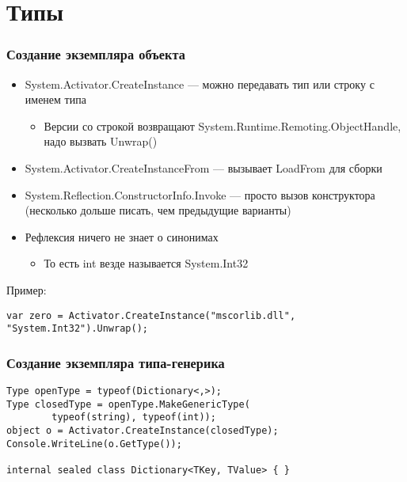 \documentclass{../../slides-style}
\begin{document}
    \section{Типы}

    \begin{frame}[fragile]
        \frametitle{Создание экземпляра объекта}
        \begin{itemize}
            \item System.Activator.CreateInstance --- можно передавать тип или строку с именем типа
            \begin{itemize}
                \item Версии со строкой возвращают System.Runtime.Remoting.ObjectHandle, надо вызвать Unwrap()
            \end{itemize}
            \item System.Activator.CreateInstanceFrom --- вызывает LoadFrom для сборки
            \item System.Reflection.ConstructorInfo.Invoke --- просто вызов конструктора (несколько дольше писать, чем предыдущие варианты)
            \item Рефлексия ничего не знает о синонимах
            \begin{itemize}
                \item То есть int везде называется System.Int32
            \end{itemize}
        \end{itemize}
        Пример:
        \begin{small}
            \begin{verbatim}
var zero = Activator.CreateInstance("mscorlib.dll", "System.Int32").Unwrap();
            \end{verbatim}
        \end{small}
    \end{frame}

    \begin{frame}[fragile]
        \frametitle{Создание экземпляра типа-генерика}
        \begin{verbatim}
Type openType = typeof(Dictionary<,>);
Type closedType = openType.MakeGenericType(
        typeof(string), typeof(int));
object o = Activator.CreateInstance(closedType);
Console.WriteLine(o.GetType());

internal sealed class Dictionary<TKey, TValue> { }
        \end{verbatim}
    \end{frame}
\end{document}
